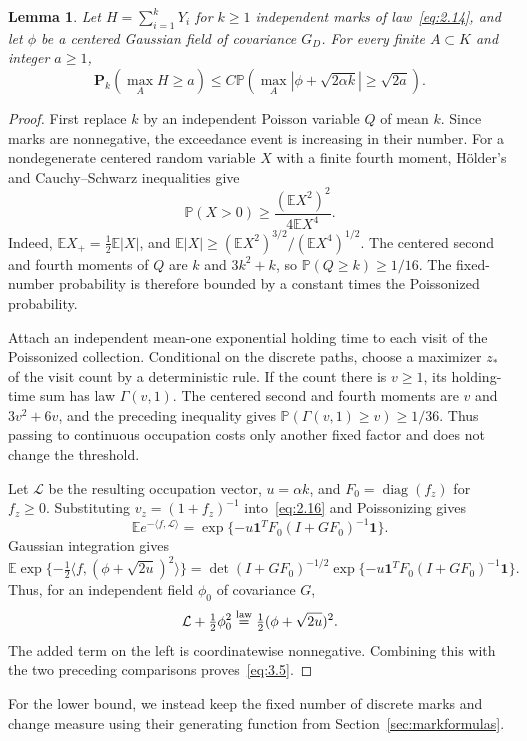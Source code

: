 \documentclass[11pt,a4paper]{article}
\numberwithin{equation}{section}
\newtheorem{lemma}[theorem]{Lemma}
\theoremstyle{remark}
\begin{document}
\begin{lemma}\label{lem:oneway}
Let $H=\sum_{i=1}^kY_i$ for $k\ge1$ independent marks of law~\eqref{eq:2.14}, and let $\phi$ be a centered Gaussian field of covariance $G_D$. For every finite $A\subset K$ and integer $a\ge1$,
\begin{equation}\label{eq:3.5}
\mathbf P_k(\max_AH\ge a)
\le C\mathbb P\left(\max_A|\phi+\sqrt{2\alpha k}|\ge\sqrt{2a}\right).
\end{equation}
\end{lemma}
\begin{proof}
First replace $k$ by an independent Poisson variable $Q$ of mean $k$. Since marks are nonnegative, the exceedance event is increasing in their number. For a nondegenerate centered random variable $X$ with a finite fourth moment, H\"older's and Cauchy--Schwarz inequalities give
\[
\mathbb P(X>0)\ge
\frac{(\mathbb E X^2)^2}{4\mathbb E X^4}.
\]
Indeed, $\mathbb E X_+=\tfrac12\mathbb E|X|$, and
$\mathbb E|X|\ge(\mathbb E X^2)^{3/2}/(\mathbb E X^4)^{1/2}$.
The centered second and fourth moments of $Q$ are $k$ and $3k^2+k$, so $\mathbb P(Q\ge k)\ge1/16$. The fixed-number probability is therefore bounded by a constant times the Poissonized probability.

Attach an independent mean-one exponential holding time to each visit of the Poissonized collection. Conditional on the discrete paths, choose a maximizer $z_*$ of the visit count by a deterministic rule. If the count there is $v\ge1$, its holding-time sum has law $\Gamma(v,1)$. The centered second and fourth moments are $v$ and $3v^2+6v$, and the preceding inequality gives $\mathbb P(\Gamma(v,1)\ge v)\ge1/36$. Thus passing to continuous occupation costs only another fixed factor and does not change the threshold.

Let $\mathcal L$ be the resulting occupation vector, $u=\alpha k$, and $F_0=\operatorname{diag}(f_z)$ for $f_z\ge0$. Substituting $v_z=(1+f_z)^{-1}$ into~\eqref{eq:2.16} and Poissonizing gives
\begin{equation}\label{eq:3.6}
\mathbb E e^{-\langle f,\mathcal L\rangle}
=\exp\{-u\mathbf1^TF_0(I+GF_0)^{-1}\mathbf1\}.
\end{equation}
Gaussian integration gives
\[
\mathbb E\exp\{-\tfrac12\langle f,(\phi+\sqrt{2u})^2\rangle\}
=\det(I+GF_0)^{-1/2}
\exp\{-u\mathbf1^TF_0(I+GF_0)^{-1}\mathbf1\}.
\]
Thus, for an independent field $\phi_0$ of covariance $G$,
\begin{equation}\label{eq:3.7}
\mathcal L+\tfrac12\phi_0^2
\overset{\rm law}=\tfrac12(\phi+\sqrt{2u})^2.
\end{equation}
The added term on the left is coordinatewise nonnegative. Combining this with the two preceding comparisons proves~\eqref{eq:3.5}.
\end{proof}
For the lower bound, we instead keep the fixed number of discrete marks and change measure using their generating function from Section~\ref{sec:markformulas}.
\end{document}
